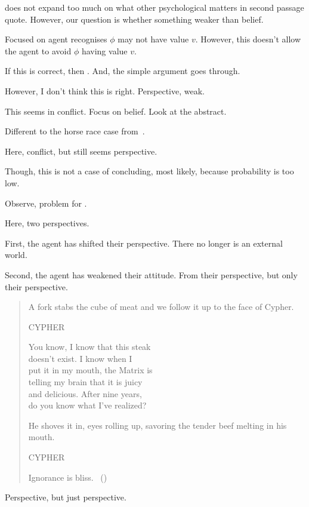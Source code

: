 \begin{note}
{    \citeauthor{Collins:1997wn} does not expand too much on what other psychological matters in second passage quote.
    However, our question is whether something weaker than belief.
  }

  Focused on agent recognises \(\phi\) may not have value \(v\).
  However, this doesn't allow the agent to avoid \(\phi\) having value \(v\).

  If this is correct, then \ptivity{}.
  And, the simple argument goes through.

  However, I don't think this is right.
  Perspective, weak.

  This seems in conflict.
  Focus on belief.
  Look at the abstract.
\end{note}

\begin{note}
  Different to the horse race case from~\textcite{Hawthorne:2016wv}.

  Here, conflict, but still seems perspective.

  Though, this is not a case of concluding, most likely, because probability is too low.
\end{note}

\begin{note}
  Observe, problem for \citeauthor{Descartes:1996vp}.

  Here, two perspectives.

  First, the agent has shifted their perspective.
  There no longer is an external world.

  Second, the agent has weakened their attitude.
  From their perspective, but only their perspective.
\end{note}

\begin{note}
  \begin{quote}
    \ttfamily

    A fork stabs the cube of meat and we follow it up to the face of Cypher.

    \qquad\qquad CYPHER

    \qquad You know, I know that this steak \\
    \indent\qquad doesn't exist. I know when I \\
    \indent\qquad put it in my mouth, the Matrix is \\
    \indent\qquad telling my brain that it is juicy \\
    \indent\qquad and delicious. After nine years, \\
    \indent\qquad do you know what I've realized?

    He shoves it in, eyes rolling up, savoring the tender beef melting in his mouth.

    \qquad\qquad CYPHER

    \qquad Ignorance is bliss.%
    \mbox{ }\hfill\mbox{(\citeyear[330--331]{Wachowski:2000uh})}
  \end{quote}

  Perspective, but just perspective.
\end{note}

